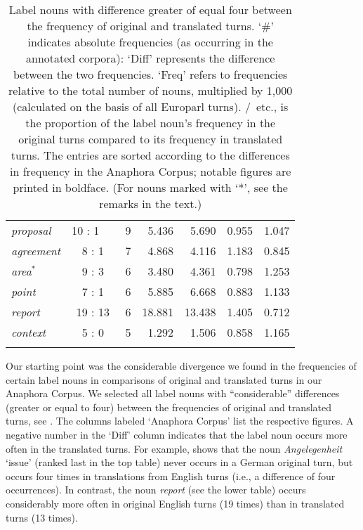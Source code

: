 \documentclass[output=paper]{LSP/langsci}
\begin{document}
\begin{table}[b]
{\begin{tabular}{p{11.5em} @{~~}cr@{~~} *{4}{r}}
\textit{proposal} & 10 : 1 \ \ & 9 &
5.436  &
5.690  & 
0.955 &   
1.047  \\  

\textit{agreement} & 8 : 1 & 7 &
4.868  &
4.116  & 
1.183  &   
0.845 \\   

\textit{area}$^*$ & 9 : 3 & 6 &
3.480  &
4.361  & 
0.798  &   
1.253  \\

\textit{point} & 7 : 1 & 6 &
5.885 &
6.668 &  
0.883 &    
1.133 \\

\textit{report} & 19 : 13 & 6 &
18.881 &
13.438 & 
{1.405}  &   
0.712 \\   

\textit{context} & 5 : 0 & 5 & 
1.292  &
1.506  & 
0.858 &   
1.165  \\
\lspbottomrule
\end{tabular}  
}


\caption{Label nouns with difference greater of equal four between the frequency of original and translated turns. `\#' indicates absolute frequencies (as occurring in the annotated corpora): `Diff' represents the difference between the two frequencies. `Freq' refers to frequencies relative to the total number of nouns, multiplied by 1,000 (calculated on the basis of all Europarl turns). \DEo/\DEt\ etc., is the proportion of the label noun's frequency in the original turns compared to its frequency in translated turns. The entries are sorted according to the differences in frequency in the Anaphora Corpus; notable figures are printed in boldface. (For nouns marked with `*', see the remarks in the text.)}\label{tab:differences}
\end{table}


Our starting point was the considerable divergence we found in the frequencies of certain label nouns in comparisons of original and translated turns in our Anaphora Corpus. We selected all label nouns with ``considerable'' differences (greater or equal to four) between the frequencies of original and translated turns, see . The columns labeled `Anaphora Corpus' list the respective figures. A negative number in the `Diff' column indicates that the label noun occurs more often in the translated turns. For example,  shows that the noun \textit{Angelegenheit} `issue' (ranked last in the top table) never occurs in a German original turn, but occurs four times in translations from English turns (i.e., a difference of four occurrences). In contrast, the noun \textit{report} (see the lower table) occurs considerably more often in original English turns (19 times) than in translated turns (13 times). 
\end{document}
